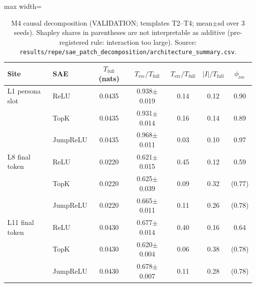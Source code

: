 \begin{table}[t]
\centering
\small
\caption{M4 causal decomposition (VALIDATION; templates T2--T4; mean$\pm$sd over 3 seeds). Shapley shares in parentheses are not interpretable as additive (pre-registered rule: interaction too large). Source: \texttt{results/\allowbreak{}repe/\allowbreak{}sae\_patch\_decomposition/\allowbreak{}architecture\_summary.csv}.}
\label{tab:m4}
\begin{adjustbox}{max width=\linewidth}
\begin{tabular}{llccccc}
\toprule
Site & SAE & $T_{\text{full}}$ (nats) & $T_{\text{rec}}/T_{\text{full}}$ & $T_{\text{err}}/T_{\text{full}}$ & $|I|/T_{\text{full}}$ & $\phi_{\text{rec}}$ \\
\midrule
L1 persona slot & ReLU & 0.0435 & 0.938$\pm$0.019 & 0.14 & 0.12 & 0.90 \\
 & TopK & 0.0435 & 0.931$\pm$0.014 & 0.16 & 0.14 & 0.89 \\
 & JumpReLU & 0.0435 & 0.968$\pm$0.011 & 0.03 & 0.10 & 0.97 \\
L8 final token & ReLU & 0.0220 & 0.621$\pm$0.015 & 0.45 & 0.12 & 0.59 \\
 & TopK & 0.0220 & 0.625$\pm$0.039 & 0.09 & 0.32 & (0.77) \\
 & JumpReLU & 0.0220 & 0.665$\pm$0.011 & 0.11 & 0.26 & (0.78) \\
L11 final token & ReLU & 0.0430 & 0.677$\pm$0.014 & 0.40 & 0.16 & 0.64 \\
 & TopK & 0.0430 & 0.620$\pm$0.004 & 0.06 & 0.38 & (0.78) \\
 & JumpReLU & 0.0430 & 0.678$\pm$0.007 & 0.11 & 0.28 & (0.78) \\
\bottomrule
\end{tabular}
\end{adjustbox}
\end{table}
